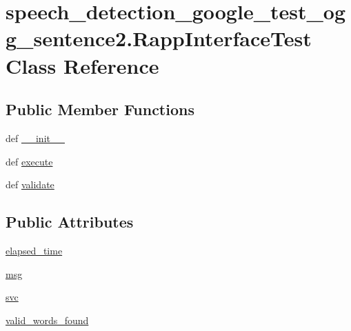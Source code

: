 \hypertarget{classspeech__detection__google__test__ogg__sentence2_1_1RappInterfaceTest}{\section{speech\-\_\-detection\-\_\-google\-\_\-test\-\_\-ogg\-\_\-sentence2.\-Rapp\-Interface\-Test Class Reference}
\label{classspeech__detection__google__test__ogg__sentence2_1_1RappInterfaceTest}
}
\subsection*{Public Member Functions}
\begin{DoxyCompactItemize}
\item 
def \hyperlink{classspeech__detection__google__test__ogg__sentence2_1_1RappInterfaceTest_ad554c94c356c13d1d420eee1c29c3a04}{\-\_\-\-\_\-init\-\_\-\-\_\-}
\item 
def \hyperlink{classspeech__detection__google__test__ogg__sentence2_1_1RappInterfaceTest_a267646b98ec523a23dfd85e56d0430fd}{execute}
\item 
def \hyperlink{classspeech__detection__google__test__ogg__sentence2_1_1RappInterfaceTest_afea4b5c70a8edbb5b0c79d105783c6e7}{validate}
\end{DoxyCompactItemize}
\subsection*{Public Attributes}
\begin{DoxyCompactItemize}
\item 
\hyperlink{classspeech__detection__google__test__ogg__sentence2_1_1RappInterfaceTest_a63e97f58cceb38c889d29b5ce14197f9}{elapsed\-\_\-time}
\item 
\hyperlink{classspeech__detection__google__test__ogg__sentence2_1_1RappInterfaceTest_a95b8a8c95a2c91e6a27d02995f0a66ff}{msg}
\item 
\hyperlink{classspeech__detection__google__test__ogg__sentence2_1_1RappInterfaceTest_ab573dab544456124b2bd694f577a5bb3}{svc}
\item 
\hyperlink{classspeech__detection__google__test__ogg__sentence2_1_1RappInterfaceTest_afa9a6449293346d27b73fc6e379cc70e}{valid\-\_\-words\-\_\-found}
\end{DoxyCompactItemize}


